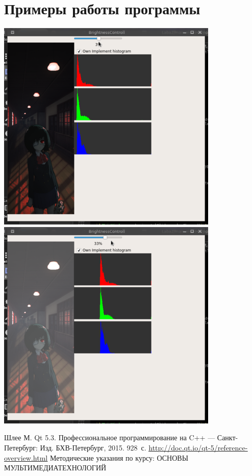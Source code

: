 \documentclass[russian,a4paper,12pt]{scrartcl}
\begin{document}
	\section{Примеры работы программы}
		\includegraphics{screen3}\\
		\includegraphics{screen4}
	\newpage
	\begin{thebibliography}{9}
		Шлее М. Qt 5.3. Профессиональное программирование на C++ \newblock --- Санкт-Петербург:
		Изд.  БХВ-Петербург, 2015. 928~с.
		 \href{http://doc.qt.io/qt-5/reference-overview.html}{\underline{http://doc.qt.io/qt-5/reference-overview.html}}
		Методические указания по курсу: ОСНОВЫ МУЛЬТИМЕДИАТЕХНОЛОГИЙ
	\end{thebibliography}
\end{document}
